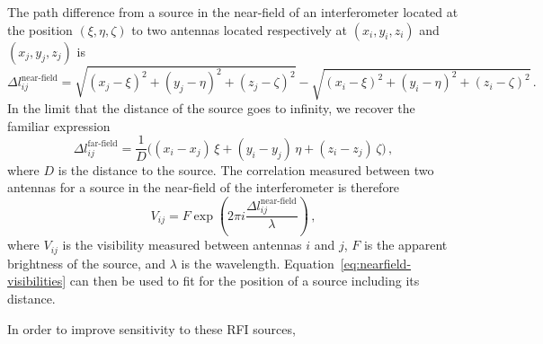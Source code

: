 \begin{bibunit}
The path difference from a source in the near-field of an interferometer located at the position
$(\xi, \eta, \zeta)$ to two antennas located respectively at $(x_i, y_i, z_i)$ and $(x_j, y_j, z_j)$
is
\begin{equation}\label{eq:nearfield-path-difference}
    \Delta l^\text{near-field}_{ij} =
        \sqrt{(x_j - \xi)^2 + (y_j - \eta)^2 + (z_j - \zeta)^2}
        - \sqrt{(x_i - \xi)^2 + (y_i - \eta)^2 + (z_i - \zeta)^2}\,.
\end{equation}
In the limit that the distance of the source goes to infinity, we recover the familiar expression
\begin{equation}\label{eq:farfield-path-difference}
    \Delta l^\text{far-field}_{ij} = \frac{1}{D}\Big(
        (x_i - x_j)\,\xi + (y_i - y_j)\,\eta + (z_i - z_j)\,\zeta
    \Big)\,,
\end{equation}
where $D$ is the distance to the source. The correlation measured between two antennas for a source
in the near-field of the interferometer is therefore
\begin{equation}\label{eq:nearfield-visibilities}
    V_{ij} = F \exp\left(2\pi i \frac{\Delta l^\text{near-field}_{ij}}{\lambda}\right)\,,
\end{equation}
where $V_{ij}$ is the visibility measured between antennas $i$ and $j$, $F$ is the apparent
brightness of the source, and $\lambda$ is the wavelength. Equation~\ref{eq:nearfield-visibilities}
can then be used to fit for the position of a source including its distance.

In order to improve sensitivity to these RFI sources,



\end{bibunit}

